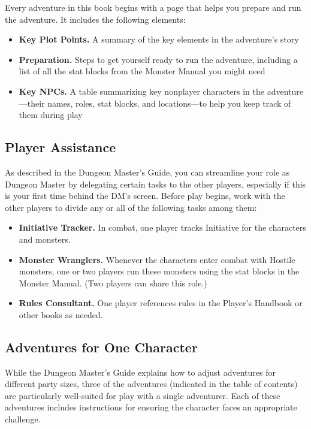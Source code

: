 \documentclass[letterpaper, 11pt, twocolumn]{dndbook}
\begin{document}
Every adventure in this book begins with a page that helps you prepare and run the adventure. It includes the following elements:

\begin{itemize}
\item \textbf{Key Plot Points.} A summary of the key elements in the adventure's story
\item \textbf{Preparation.} Steps to get yourself ready to run the adventure, including a list of all the stat blocks from the Monster Manual you might need
\item \textbf{Key NPCs.} A table summarizing key nonplayer characters in the adventure---their names, roles, stat blocks, and locations---to help you keep track of them during play
\end{itemize}

\subsection{Player Assistance}

As described in the Dungeon Master's Guide, you can streamline your role as Dungeon Master by delegating certain tasks to the other players, especially if this is your first time behind the DM's screen. Before play begins, work with the other players to divide any or all of the following tasks among them:

\begin{itemize}
\item \textbf{Initiative Tracker.} In combat, one player tracks Initiative for the characters and monsters.
\item \textbf{Monster Wranglers.} Whenever the characters enter combat with Hostile monsters, one or two players run these monsters using the stat blocks in the Monster Manual. (Two players can share this role.)
\item \textbf{Rules Consultant.} One player references rules in the Player's Handbook or other books as needed.
\end{itemize}

\subsection{Adventures for One Character}

While the Dungeon Master's Guide explains how to adjust adventures for different party sizes, three of the adventures (indicated in the table of contents) are particularly well-suited for play with a single adventurer. Each of these adventures includes instructions for ensuring the character faces an appropriate challenge.
\end{document}

